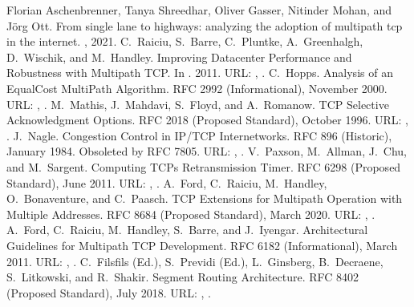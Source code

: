 \documentclass[letterpaper,10pt,english]{sphinxmanual}
\begin{document}
\begin{sphinxthebibliography}{10}
\sphinxAtStartPar
Florian Aschenbrenner, Tanya Shreedhar, Oliver Gasser, Nitinder Mohan, and Jörg Ott. From single lane to highways: analyzing the adoption of multipath tcp in the internet. , 2021.
\sphinxAtStartPar
C. Raiciu, S. Barre, C. Pluntke, A. Greenhalgh, D. Wischik, and M. Handley. Improving Datacenter Performance and Robustness with Multipath TCP. In . 2011. URL: , .
\sphinxAtStartPar
C. Hopps. Analysis of an Equal\sphinxhyphen{}Cost Multi\sphinxhyphen{}Path Algorithm. RFC 2992 (Informational), November 2000. URL: , .
\sphinxAtStartPar
M. Mathis, J. Mahdavi, S. Floyd, and A. Romanow. TCP Selective Acknowledgment Options. RFC 2018 (Proposed Standard), October 1996. URL: , .
\sphinxAtStartPar
J. Nagle. Congestion Control in IP/TCP Internetworks. RFC 896 (Historic), January 1984. Obsoleted by RFC 7805. URL: , .
\sphinxAtStartPar
V. Paxson, M. Allman, J. Chu, and M. Sargent. Computing TCP\textquotesingle{}s Retransmission Timer. RFC 6298 (Proposed Standard), June 2011. URL: , .
\sphinxAtStartPar
A. Ford, C. Raiciu, M. Handley, O. Bonaventure, and C. Paasch. TCP Extensions for Multipath Operation with Multiple Addresses. RFC 8684 (Proposed Standard), March 2020. URL: , .
\sphinxAtStartPar
A. Ford, C. Raiciu, M. Handley, S. Barre, and J. Iyengar. Architectural Guidelines for Multipath TCP Development. RFC 6182 (Informational), March 2011. URL: , .
\sphinxAtStartPar
C. Filsfils (Ed.), S. Previdi (Ed.), L. Ginsberg, B. Decraene, S. Litkowski, and R. Shakir. Segment Routing Architecture. RFC 8402 (Proposed Standard), July 2018. URL: , .

\end{sphinxthebibliography}
\end{document}
